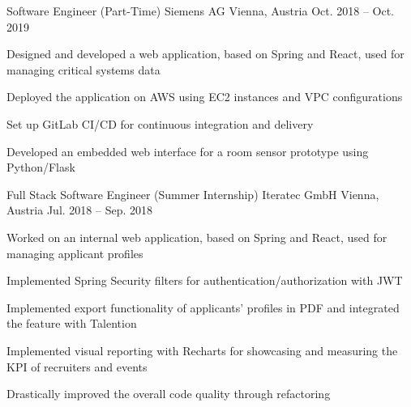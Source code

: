 


\begin{cventries}


\cventry
{Software Engineer (Part-Time)} %
{Siemens AG} %
{Vienna, Austria} %
{Oct. 2018 -- Oct. 2019} %
{ %
\begin{cvitems}
\item {Designed and developed a web application, based on Spring and React, used for managing critical systems data}
\item {Deployed the application on AWS using EC2 instances and VPC configurations}
\item {Set up GitLab CI/CD for continuous integration and delivery}
\item {Developed an embedded web interface for a room sensor prototype using Python/Flask}
\end{cvitems}
}


\cventry
{Full Stack Software Engineer (Summer Internship)} %
{Iteratec GmbH} %
{Vienna, Austria} %
{Jul. 2018 -- Sep. 2018} %
{ %
\begin{cvitems}
\item {Worked on an internal web application, based on Spring and React, used for managing applicant profiles}
\item {Implemented Spring Security filters for authentication/authorization with JWT}
\item {Implemented export functionality of applicants' profiles in PDF and integrated the feature with Talention}
\item {Implemented visual reporting with Recharts for showcasing and measuring the KPI of recruiters and events}
\item {Drastically improved the overall code quality through refactoring}
\end{cvitems}
}


\end{cventries}
